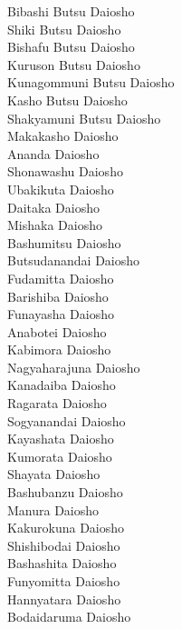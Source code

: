 \documentclass[12pt]{report}
\begin{document}
\begin{multicols*}{3}    %
  Bibashi Butsu Daiosho      \\
  Shiki Butsu Daiosho        \\ 
  Bishafu Butsu Daiosho      \\ 
  Kuruson Butsu Daiosho      \\ 
  Kunagommuni Butsu Daiosho  \\ 
  Kasho Butsu Daiosho        \\ 
  Shakyamuni Butsu Daiosho   \\ 
  Makakasho Daiosho          \\ 
  Ananda Daiosho             \\ 
  Shonawashu Daiosho         \\ 
  Ubakikuta Daiosho          \\ 
  Daitaka Daiosho            \\ 
  Mishaka Daiosho            \\ 
  Bashumitsu Daiosho         \\ 
  Butsudanandai Daiosho      \\ 
  Fudamitta Daiosho          \\ 
  Barishiba Daiosho          \\ 
  Funayasha Daiosho          \\ 
  Anabotei Daiosho           \\ 
  Kabimora Daiosho           \\ 
  Nagyaharajuna Daiosho      \\ 
  Kanadaiba Daiosho          \\ 
  Ragarata Daiosho           \\ 
  Sogyanandai Daiosho        \\ 
  Kayashata Daiosho          \\ 
  Kumorata Daiosho           \\ 
  Shayata Daiosho            \\ 
  Bashubanzu Daiosho         \\ 
  Manura Daiosho             \columnbreak \\
  Kakurokuna Daiosho         \\
  Shishibodai Daiosho        \\ 
  Bashashita Daiosho         \\ 
  Funyomitta Daiosho         \\ 
  Hannyatara Daiosho         \\ 
  Bodaidaruma Daiosho        \\ 

\end{multicols*}
\end{document}
